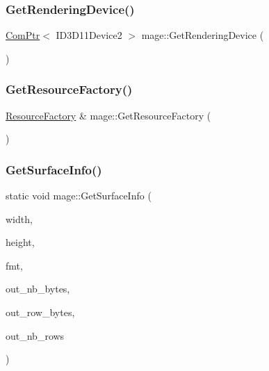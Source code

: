 \subsubsection{\texorpdfstring{Get\+Rendering\+Device()}{GetRenderingDevice()}}
{\footnotesize\ttfamily \hyperlink{namespacemage_ae74f374780900893caa5555d1031fd79}{Com\+Ptr}$<$ I\+D3\+D11\+Device2 $>$ mage\+::\+Get\+Rendering\+Device (\begin{DoxyParamCaption}{ }\end{DoxyParamCaption})}

\hypertarget{namespacemage_ad773a6b6442b973421222b664229e86d}{}\label{namespacemage_ad773a6b6442b973421222b664229e86d} 
\subsubsection{\texorpdfstring{Get\+Resource\+Factory()}{GetResourceFactory()}}
{\footnotesize\ttfamily \hyperlink{classmage_1_1_resource_factory}{Resource\+Factory} \& mage\+::\+Get\+Resource\+Factory (\begin{DoxyParamCaption}{ }\end{DoxyParamCaption})}

\hypertarget{namespacemage_a7b67bb6f38f3e787fb3561d236b88bd2}{}\label{namespacemage_a7b67bb6f38f3e787fb3561d236b88bd2} 
\subsubsection{\texorpdfstring{Get\+Surface\+Info()}{GetSurfaceInfo()}}
{\footnotesize\ttfamily static void mage\+::\+Get\+Surface\+Info (\begin{DoxyParamCaption}\item[{\+\_\+\+In\+\_\+ size\+\_\+t}]{width,  }\item[{\+\_\+\+In\+\_\+ size\+\_\+t}]{height,  }\item[{\+\_\+\+In\+\_\+ D\+X\+G\+I\+\_\+\+F\+O\+R\+M\+AT}]{fmt,  }\item[{\+\_\+\+Out\+\_\+opt\+\_\+ size\+\_\+t $\ast$}]{out\+\_\+nb\+\_\+bytes,  }\item[{\+\_\+\+Out\+\_\+opt\+\_\+ size\+\_\+t $\ast$}]{out\+\_\+row\+\_\+bytes,  }\item[{\+\_\+\+Out\+\_\+opt\+\_\+ size\+\_\+t $\ast$}]{out\+\_\+nb\+\_\+rows }\end{DoxyParamCaption})\hspace{0.3cm}{\ttfamily [static]}}

